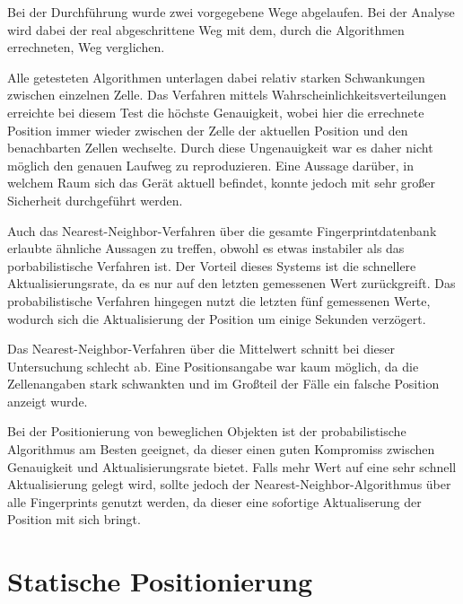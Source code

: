 Bei der Durchführung wurde zwei vorgegebene Wege abgelaufen. Bei der Analyse wird dabei der real abgeschrittene Weg mit dem, durch die Algorithmen errechneten, Weg verglichen.

Alle getesteten Algorithmen unterlagen dabei relativ starken Schwankungen zwischen einzelnen Zelle. Das Verfahren mittels Wahrscheinlichkeitsverteilungen erreichte bei diesem Test die höchste Genauigkeit, wobei hier die errechnete Position immer wieder zwischen der Zelle der aktuellen Position und den benachbarten Zellen wechselte. Durch diese Ungenauigkeit war es daher nicht möglich den genauen Laufweg zu reproduzieren. Eine Aussage darüber, in welchem Raum sich das Gerät aktuell befindet, konnte jedoch mit sehr großer Sicherheit durchgeführt werden.

Auch das Nearest-Neighbor-Verfahren über die gesamte Fingerprintdatenbank erlaubte ähnliche Aussagen zu treffen, obwohl es etwas instabiler als das porbabilistische Verfahren ist. Der Vorteil dieses Systems ist die schnellere Aktualisierungsrate, da es nur auf den letzten gemessenen Wert zurückgreift. Das probabilistische Verfahren hingegen nutzt die letzten fünf gemessenen Werte, wodurch sich die Aktualisierung der Position um einige Sekunden verzögert.

Das Nearest-Neighbor-Verfahren über die Mittelwert schnitt bei dieser Untersuchung schlecht ab. Eine Positionsangabe war kaum möglich, da die Zellenangaben stark schwankten und im Großteil der Fälle ein falsche Position anzeigt wurde.


Bei der Positionierung von beweglichen Objekten ist der probabilistische Algorithmus am Besten geeignet, da dieser einen guten Kompromiss zwischen Genauigkeit und Aktualisierungsrate bietet. Falls mehr Wert auf eine sehr schnell Aktualisierung gelegt wird, sollte jedoch der Nearest-Neighbor-Algorithmus über alle Fingerprints genutzt werden, da dieser eine sofortige Aktualiserung der Position mit sich bringt.

\section{Statische Positionierung}
\label{sec:testing:static}

